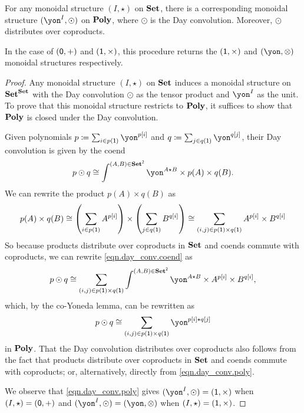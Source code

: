 \documentclass[Book-Poly]{subfiles}
\begin{document}
\begin{proposition} \label{prop.day}
For any monoidal structure $(I,\star)$ on $\mathbf{Set}$, there is a corresponding monoidal structure $(\yon^I, \odot)$ on $\mathbf{Poly}$, where $\odot$ is the Day convolution.
Moreover, $\odot$ distributes over coproducts.

In the case of $(\textsf{0},+)$ and $(\textsf{1},\times)$, this procedure returns the $(\textsf{1},\times)$ and $(\yon,\otimes)$ monoidal structures respectively.
\end{proposition}
\begin{proof}
Any monoidal structure $(I,\star)$ on $\mathbf{Set}$ induces a monoidal structure on $\mathbf{Set}^{\mathbf{Set}}$ with the Day convolution $\odot$ as the tensor product and $\yon^I$ as the unit.
To prove that this monoidal structure restricts to $\mathbf{Poly}$, it suffices to show that $\mathbf{Poly}$ is closed under the Day convolution.

Given polynomials $p\coloneqq\sum_{i \in p(\1)} \yon^{p[i]}$ and $q\coloneqq\sum_{j \in q(\1)} \yon^{q[j]}$, their Day convolution is given by the coend
\begin{equation} \label{eqn.day_conv.coend}
    p \odot q \iso \int^{(A,B)\in\smset^\2} \yon^{A \star B} \times p(A) \times q(B).
\end{equation}
We can rewrite the product $p(A) \times q(B)$ as
\[
    p(A) \times q(B) \iso \left(\sum_{i \in p(\1)} A^{p[i]}\right) \times \left(\sum_{j \in q(\1)} B^{q[i]}\right) \iso \sum_{(i,j) \in p(\1) \times q(\1)} A^{p[i]} \times B^{q[i]} %
\]
So because products distribute over coproducts in $\mathbf{Set}$ and coends commute with coproducts, we can rewrite \eqref{eqn.day_conv.coend} as
\[
    p \odot q \iso \sum_{(i,j) \in p(\1) \times q(\1)} \int^{(A,B)\in\smset^\2} \yon^{A \star B} \times A^{p[i]} \times B^{q[i]},
\]
which, by the co-Yoneda lemma, can be rewritten as
\begin{equation} \label{eqn.day_conv.poly}
    p \odot q \iso \sum_{(i,j) \in p(\1) \times q(\1)} \yon^{p[i] \star q[j]}
\end{equation}
in $\mathbf{Poly}$.
That the Day convolution distributes over coproducts also follows from the fact that products distribute over coproducts in $\mathbf{Set}$ and coends commute with coproducts; or, alternatively, directly from \eqref{eqn.day_conv.poly}.

We observe that \eqref{eqn.day_conv.poly} gives $(\yon^I, \odot) = (\1, \times)$ when $(I, \star) = (\textsf{0}, +)$ and $(\yon^I, \odot) = (\yon, \otimes)$ when $(I, \star) = (\textsf{1}, \times)$.
\end{proof}
\end{document}

